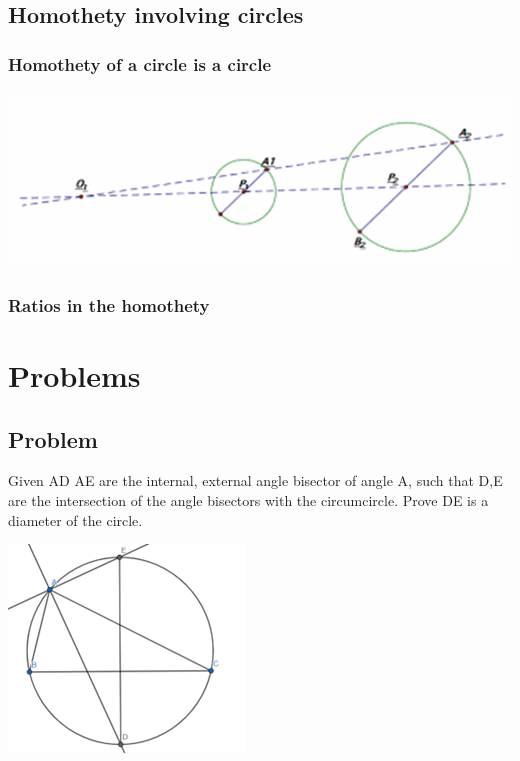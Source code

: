 \documentclass{article}
\begin{document}
\vspace{60px}

\subsection{Homothety involving circles}

\subsubsection{Homothety of a circle is a circle}

\includegraphics{Picture15.png}

\subsubsection{Ratios in the homothety}

\pagebreak

\section{Problems}

\subsection{Problem}
Given AD AE are the internal, external angle bisector of angle A,
 such that D,E are the intersection of the angle bisectors with the circumcircle. 
 Prove DE is a diameter of the circle.

\includegraphics{Picture16.png}
\end{document}

